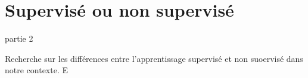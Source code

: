 \section{Supervisé ou non supervisé}

\begin{frame}{partie 2}
  \vspace{0.45cm}
  \begin{pointcle}
    \centering\large
    Recherche sur les différences entre l'apprentissage supervisé et non suoervisé dans notre contexte. E
  \end{pointcle}
\end{frame}

